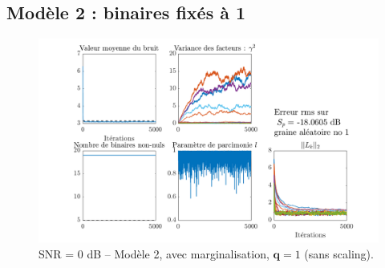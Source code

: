 \documentclass[ 12pt]{article}
\begin{document}
\subsection{Modèle 2 : binaires fixés à 1}
\begin{figure}[H]
	\centering
	\includegraphics[width=\textwidth]{ToyCase/qfixe1.png}
	\caption{SNR = 0 dB -- Modèle 2, avec marginalisation, $\bm{q}=1$ (sans scaling).}
\end{figure}
\end{document}
